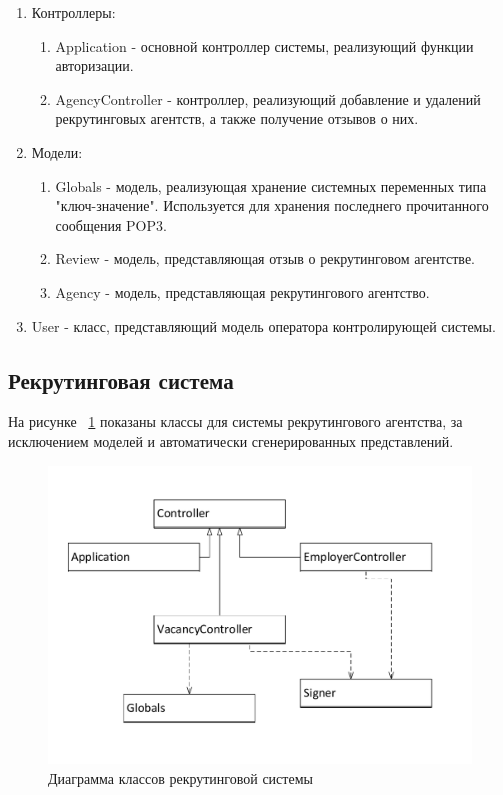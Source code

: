 \begin{enumerate}
\item Контроллеры:
\begin{enumerate}
\item Application - основной контроллер системы, реализующий функции авторизации.
\item AgencyController - контроллер, реализующий добавление и удалений рекрутинговых агентств, а также получение отзывов о них.
\end{enumerate}
\item Модели:
\begin{enumerate}
\item Globals - модель, реализующая хранение системных переменных типа "ключ-значение". Используется для хранения последнего прочитанного сообщения POP3.
\item Review - модель, представляющая отзыв о рекрутинговом агентстве.
\item Agency - модель, представляющая рекрутингового агентство.
\end{enumerate}
\item User - класс, представляющий модель оператора контролирующей системы.
\end{enumerate}

\subsection{Рекрутинговая система}
На рисунке ~\ref{fig:class-recruiting} показаны классы для системы рекрутингового агентства, за исключением моделей и автоматически сгенерированных представлений.
\begin{figure}[ht]
  \centering
  \includegraphics[width=\textwidth]{include/class-recruiting.pdf}
  \caption{Диаграмма классов рекрутинговой системы}
  \label{fig:class-recruiting}
\end{figure}

